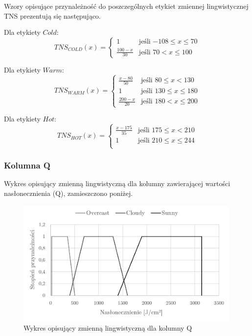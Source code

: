 \documentclass{classrep}
\begin{document}
Wzory opisujące przynależność do poszczególnych etykiet zmiennej lingwistycznej TNS prezentują się następująco. \newline

Dla etykiety $Cold$:
\begin{equation}
{TNS}_{COLD}(x)= \left\{ \begin{array}{ll}
1 			& \textrm{jeśli $-108 \leq x \leq 70$} \\
\frac{100-x}{30} 	& \textrm{jeśli $70 < x \leq 100$}
\end{array} \right.
\end{equation}

Dla etykiety $Warm$:
\begin{equation}
{TNS}_{WARM}(x)= \left\{ \begin{array}{ll}
\frac{x-80}{50} & \textrm{jeśli $80 \leq x < 130$} \\
1 			 & \textrm{jeśli $130 \leq x \leq 180$} \\
\frac{200-x}{20} & \textrm{jeśli $180 < x \leq 200$}
\end{array} \right.
\end{equation}

Dla etykiety $Hot$:
\begin{equation}
{TNS}_{HOT}(x)= \left\{ \begin{array}{ll}
\frac{x-175}{35} & \textrm{jeśli $175 \leq x < 210$} \\
1 			 & \textrm{jeśli $210 \leq x \leq 244$} \\
\end{array} \right.
\end{equation}

\clearpage



\subsubsection{Kolumna Q}
Wykres opisujący zmienną lingwistyczną dla kolumny zawierającej wartości nasłonecznienia (Q), zamieszczono poniżej.
\begin{figure}[H]
	\centering
	\includegraphics[width=0.99\textwidth]{Pictures/TermsCharts/Q.png}
	\caption{Wykres opisujący zmienną lingwistyczną dla kolumny Q}
\end{figure}
\end{document}

